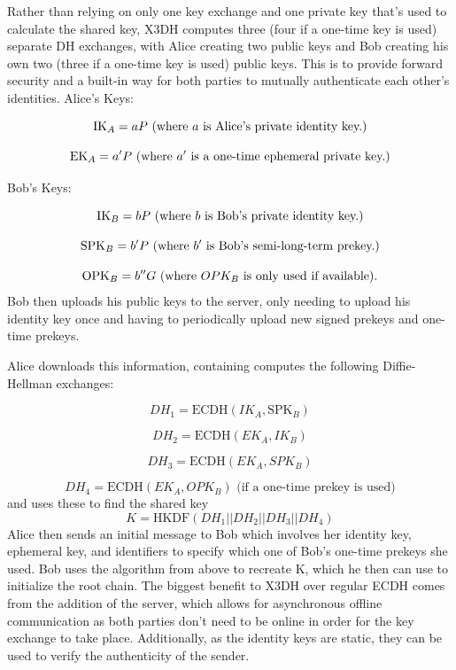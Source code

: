 Rather than relying on only one key exchange and one private key that's used to calculate the shared key, X3DH computes three (four if a one-time key is used) separate DH exchanges, with Alice creating two public keys and Bob creating his own two (three if a one-time key is used) public keys. This is to provide forward security and a built-in way for both parties to mutually authenticate each other's identities.
Alice's Keys:

\[
\text{IK}_A = aP \text{ (where \( a \) is Alice's private identity key.)}
\]


\[
\text{EK}_A = a'P \text{ (where \( a' \) is a one-time ephemeral private key.)}
\]


Bob's Keys:

\[
\text{IK}_B = bP \text{ (where \( b \) is Bob's private identity key.)}
\]


\[
\text{SPK}_B = b'P \text{ (where \( b' \) is Bob's semi-long-term prekey.)}
\]

\[
\text{OPK}_B = b''G \text{ (where \( OPK_B \) is only used if available).}
\]
Bob then uploads his public keys to the server, only needing to upload his identity key once and having to periodically upload new signed prekeys and one-time prekeys.

Alice downloads this information, containing computes the following Diffie-Hellman exchanges:

$$
DH_1 = \text{ECDH}(IK_A, \text{SPK}_B) 
$$

$$
DH_2 = \text{ECDH}(EK_A, IK_B) 
$$

$$
DH_3 = \text{ECDH}(EK_A, SPK_B) 
$$

$$
DH_4 = \text{ECDH}(EK_A, OPK_B)   \text{ (if a one-time prekey is used)}
$$
and uses these to find the shared key 
$$
K = \text{HKDF}(DH_1||DH_2||DH_3||DH_4)   
$$
Alice then sends an initial message to Bob which involves her identity key, ephemeral key, and identifiers to specify which one of Bob's one-time prekeys she used. Bob uses the algorithm from above to recreate K, which he then can use to initialize the root chain. The biggest benefit to X3DH over regular ECDH comes from the addition of the server, which allows for asynchronous offline communication as both parties don't need to be online in order for the key exchange to take place. Additionally, as the identity keys are static, they can be used to verify the authenticity of the sender.